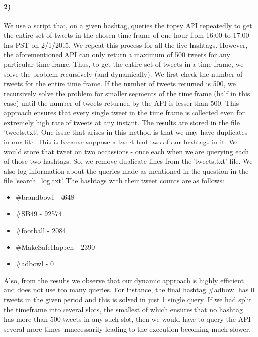 \documentclass{article}
\begin{document}
\paragraph{2)}
We use a script that, on a given hashtag, queries the topsy API repeatedly to get the entire set of tweets in the 
chosen time frame of one hour from 16:00 to 17:00 hrs PST on 2/1/2015. We repeat this process for all the 
five hashtags. However, the aforementioned API can only return a maximum of 500 tweets for any particular time frame. Thus, 
to get the entire set of tweets in a time frame, we solve the problem recursively (and dynamically). We first check the 
number of tweets for the entire time frame. If the number of tweets returned is 500, we recursively solve the problem 
for smaller segments of the time frame (half in this case) until the number of tweets returned by the API is lesser than 
500. This approach ensures that every single tweet in the time frame is collected even for extremely high rate of tweets 
at any instant. The results are stored in the file 'tweets.txt'. One issue that arises in this method is that we may have
duplicates in our file. This is because suppose a tweet had two of our hashtags in it. We would store that tweet on two 
occassions - once each when we are querying each of those two hashtags. So, we remove duplicate lines from the 'tweets.txt' file.
We also log information about the 
queries made as mentioned in the question in the file 'search\_log.txt'.
The hashtags with their tweet counts are as follows:
\begin{itemize}
 \item 
\#brandbowl - 4648
\item
\#SB49 - 92574
\item
\#football - 2084
\item
\#MakeSafeHappen - 2390
\item
\#adbowl - 0
\end{itemize}

Also, from the results we observe that our dynamic approach is highly efficient and does not use too many queries. For 
instance, the final hashtag \#adbowl has 0 tweets in the given period and this is solved in just 1 single query.
If we had split the timeframe into several slots, the smallest of which ensures that no hashtag has more than 500 tweets in
any such slot, then we would have to query the API several more times unnecessarily leading to the execution becoming much
slower.
 
\end{document}
